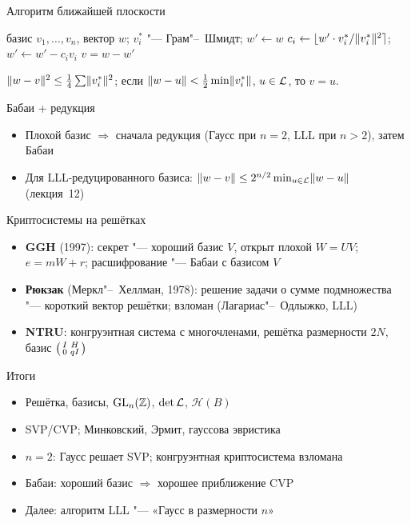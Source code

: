 \documentclass{ca-slides}
\begin{document}
\begin{canvasframe}{Алгоритм ближайшей плоскости}
  \begin{algorithmic}[1]
    \Require базис $v_1, \dots, v_n$, вектор $w$; $v_i^*$ "--- Грам"--~Шмидт; $w' \gets w$
      \State $c_i \gets \lfloor w' \cdot v_i^* / \lVert v_i^*\rVert^2\rceil$;\quad $w' \gets w' - c_i v_i$
    \EndFor
    \State \Return $v = w - w'$
  \end{algorithmic}
  \begin{proposition}
    $\lVert w - v\rVert^2 \le \frac14 \sum \lVert v_i^*\rVert^2$; если $\lVert w - u\rVert < \frac12 \min\lVert v_i^*\rVert$,
    $u \in \mathcal{L}$, то $v = u$.
  \end{proposition}
  \penspace[0.12\textheight]
\end{canvasframe}

\begin{canvasframe}{Бабаи + редукция}
  \begin{itemize}
    \item Плохой базис $\Rightarrow$ сначала редукция (Гаусс при $n = 2$, LLL при $n > 2$),
      затем Бабаи
    \item Для LLL-редуцированного базиса: $\lVert w - v\rVert \le 2^{n/2} \min_{u \in \mathcal{L}}\lVert w - u\rVert$
      (лекция~12)
  \end{itemize}
  \notearea[0.4\textheight]
\end{canvasframe}

\begin{canvasframe}{Криптосистемы на решётках}
  \begin{itemize}
    \item \textbf{GGH} (1997): секрет "--- хороший базис $V$, открыт плохой $W = UV$;
      $e = mW + r$; расшифрование "--- Бабаи с базисом $V$
    \item \textbf{Рюкзак} (Меркл"--~Хеллман, 1978): решение задачи о сумме подмножества "---
      короткий вектор решётки; взломан (Лагариас"--~Одлыжко, LLL)
    \item \textbf{NTRU}: конгруэнтная система с многочленами, решётка размерности $2N$,
      базис $\begin{psmallmatrix} I & H \\ 0 & qI\end{psmallmatrix}$
  \end{itemize}
\end{canvasframe}

\begin{canvasframe}{Итоги}
  \begin{itemize}
    \item Решётка, базисы, $\mathrm{GL}_n(\mathbb{Z})$, $\det \mathcal{L}$, $\mathcal H(B)$
    \item SVP/CVP; Минковский, Эрмит, гауссова эвристика
    \item $n = 2$: Гаусс решает SVP; конгруэнтная криптосистема взломана
    \item Бабаи: хороший базис $\Rightarrow$ хорошее приближение CVP
    \item Далее: алгоритм LLL "--- «Гаусс в размерности $n$»
  \end{itemize}
\end{canvasframe}
\end{document}
